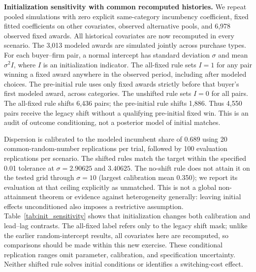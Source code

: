 \documentclass[11pt,a4paper]{article}
\begin{document}
\textbf{Initialization sensitivity with common recomputed histories.} We repeat pooled simulations with zero explicit same-category incumbency coefficient, fixed fitted coefficients on other covariates, observed alternative pools, and 6,978 observed fixed awards. All historical covariates are now recomputed in every scenario. The 3,013 modeled awards are simulated jointly across purchase types. For each buyer--firm pair, a normal intercept has standard deviation $\sigma$ and mean $\sigma^2 I$, where $I$ is an initialization indicator. The all-fixed rule sets $I=1$ for any pair winning a fixed award anywhere in the observed period, including after modeled choices. The pre-initial rule uses only fixed awards strictly before that buyer's first modeled award, across categories. The unshifted rule sets $I=0$ for all pairs. The all-fixed rule shifts 6,436 pairs; the pre-initial rule shifts 1,886. Thus 4,550 pairs receive the legacy shift without a qualifying pre-initial fixed win. This is an audit of outcome conditioning, not a posterior model of initial matches.

Dispersion is calibrated to the modeled incumbent share of 0.689 using 20 common-random-number replications per trial, followed by 100 evaluation replications per scenario. The shifted rules match the target within the specified 0.01 tolerance at $\sigma=2.90625$ and $3.40625$. The no-shift rule does not attain it on the tested grid through $\sigma=10$ (largest calibration mean 0.350); we report its evaluation at that ceiling explicitly as unmatched. This is not a global non-attainment theorem or evidence against heterogeneity generally: leaving initial effects unconditioned also imposes a restrictive assumption. Table~\ref{tab:init_sensitivity} shows that initialization changes both calibration and lead--lag contrasts. The all-fixed label refers only to the legacy shift mask; unlike the earlier random-intercept results, all covariates here are recomputed, so comparisons should be made within this new exercise. These conditional replication ranges omit parameter, calibration, and specification uncertainty. Neither shifted rule solves initial conditions or identifies a switching-cost effect.
\end{document}
